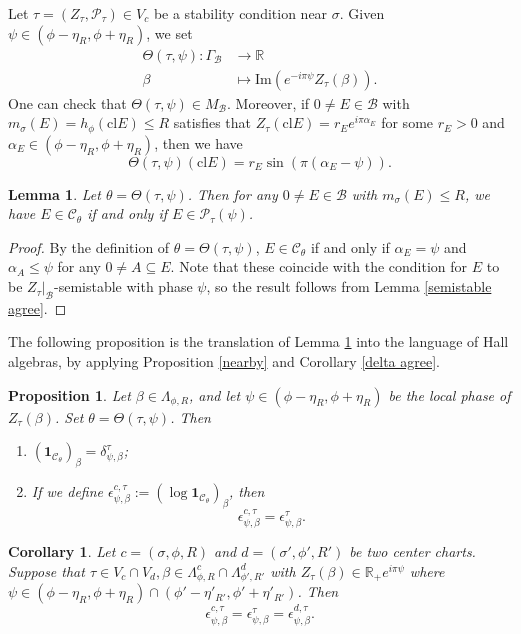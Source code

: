 \documentclass[a4paper,12pt]{amsart}
\numberwithin{equation}{section}
\newtheorem{lemma}[theorem]{Lemma}
\newtheorem{proposition}[theorem]{Proposition}
\newtheorem{corollary}[theorem]{Corollary}
\newcommand{\im}{\mathrm{Im}}
\newcommand{\cl}{\mathrm{cl}}
\newcommand{\1}{\mathbf{1}}
\begin{document}
Let $\tau=(Z_\tau,\mathcal{P}_\tau)\in V_c$ be a stability condition near $\sigma$. Given $\psi\in(\phi-\eta_R,\phi+\eta_R)$, we set
\begin{align*}
    \Theta(\tau,\psi):\Gamma_\mathcal{B}&\rightarrow\mathbb{R}\\
    \beta&\mapsto\im\left(e^{-i\pi\psi}Z_\tau(\beta)\right).
\end{align*}
One can check that $\Theta(\tau,\psi)\in M_\mathcal{B}$. Moreover, if $0\neq E\in\mathcal{B}$ with $m_\sigma(E)=h_\phi(\cl E)\leqslant R$ satisfies that $Z_\tau(\cl E)=r_Ee^{i\pi\alpha_E}$ for some $r_E>0$ and $\alpha_E\in(\phi-\eta_R,\phi+\eta_R)$, then we have
\[\Theta(\tau,\psi)(\cl E)=r_E\sin(\pi(\alpha_E-\psi)).\]
\begin{lemma}\label{Ctheta=Ptau}
    Let $\theta=\Theta(\tau,\psi)$. Then for any $0\neq E\in\mathcal{B}$ with $m_\sigma(E)\leqslant R$, we have $E\in\mathcal{C}_\theta$ if and only if $E\in\mathcal{P}_\tau(\psi)$.
\end{lemma}
\begin{proof}
    By the definition of $\theta=\Theta(\tau,\psi)$, $E\in\mathcal{C}_\theta$ if and only if $\alpha_E=\psi$ and $\alpha_A\leqslant\psi$ for any $0\neq A\subseteq E$. Note that these coincide with the condition for $E$ to be $Z_\tau|_\mathcal{B}$-semistable with phase $\psi$, so the result follows from Lemma \ref{semistable agree}.
\end{proof}
The following proposition is the translation of Lemma \ref{Ctheta=Ptau} into the language of Hall algebras, by applying Proposition \ref{nearby} and Corollary \ref{delta agree}.
\begin{proposition}\label{delta and epsilon}
    Let $\beta\in\Lambda_{\phi,R}$, and let $\psi\in(\phi-\eta_R,\phi+\eta_R)$ be the local phase of $Z_\tau(\beta)$. Set $\theta=\Theta(\tau,\psi)$. Then
    \begin{enumerate}
        \item $(\1_{\mathcal{C}_\theta})_\beta=\delta^\tau_{\psi,\beta}$;
        \item If we define $\epsilon^{c,\tau}_{\psi,\beta}:= (\log\1_{\mathcal{C}_\theta})_\beta$, then
        \[\epsilon^{c,\tau}_{\psi,\beta}=\epsilon^\tau_{\psi,\beta}.\]
    \end{enumerate}
\end{proposition}
\begin{corollary}\label{switching}
    Let $c=(\sigma,\phi,R)$ and $d=(\sigma',\phi',R')$ be two center charts. Suppose that $\tau\in V_c\cap V_d,\beta\in\Lambda^c_{\phi,R}\cap\Lambda^d_{\phi',R'}$ with $Z_\tau(\beta)\in\mathbb{R}_+e^{i\pi\psi}$ where $\psi\in(\phi-\eta_R,\phi+\eta_R)\cap(\phi'-\eta'_{R'},\phi'+\eta'_{R'})$. Then
    \[\epsilon^{c,\tau}_{\psi,\beta}=\epsilon^{\tau}_{\psi,\beta}=\epsilon^{d,\tau}_{\psi,\beta}.\]
\end{corollary}
\end{document}
